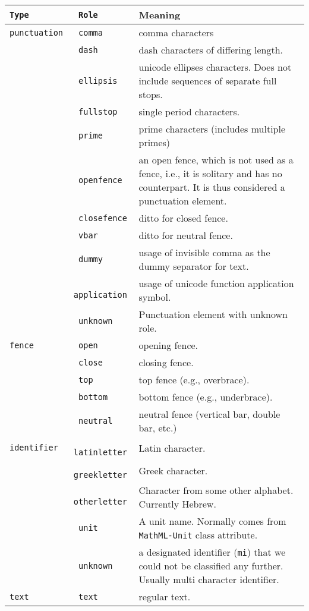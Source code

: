 \documentclass{article}
\def\mathml#1{\texttt{#1}}
\begin{document}
\begin{tabular}{>{\tt}l>{\tt}lp{11cm}}
  Type & Role & Meaning\\\hline
  punctuation & comma & comma characters\\
              & dash & dash characters of differing length.\\
              & ellipsis & unicode ellipses characters. Does not include sequences of separate full stops.\\
              & fullstop & single period characters.\\
              & prime & prime characters (includes multiple primes)\\
              & openfence & an open fence, which is not used as a fence, i.e., it is solitary
                            and has no counterpart. It is thus considered a punctuation element.\\
              & closefence & ditto for closed fence.\\
              & vbar & ditto for neutral fence.\\
              & dummy & usage of invisible comma as the dummy separator for text.\\
              & application & usage of unicode function application symbol.\\
              & unknown & Punctuation element with unknown role.\\
  fence & open & opening fence.\\
              & close & closing fence.\\
              & top & top fence (e.g., overbrace).\\
              & bottom & bottom fence (e.g., underbrace).\\
              & neutral & neutral fence (vertical bar, double bar, etc.)\\
  identifier & latinletter & Latin character.\\
              & greekletter & Greek character.\\
              & otherletter & Character from some other alphabet. Currently Hebrew.\\
              & unit & A unit name. Normally comes from \mathml{MathML-Unit} class attribute.\\
              & unknown & a designated identifier (\mathml{mi}) that we could not be classified any
                          further. Usually multi character identifier.\\
  text   & text & regular text.\\

\end{tabular}
\end{document}
